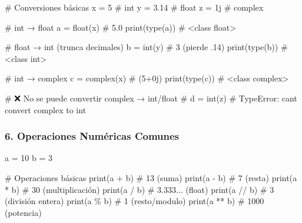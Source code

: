 \documentclass[
  doc,
  floatsintext,
  longtable,
  a4paper,
  nolmodern,
  notxfonts,
  notimes,
  12pt,
  colorlinks=true,linkcolor=blue,citecolor=blue,urlcolor=blue]{apa7}
\newenvironment{Shaded}{\begin{snugshade}}{\end{snugshade}}
\newcommand{\BuiltInTok}[1]{\textcolor[rgb]{0.00,0.23,0.31}{#1}}
\newcommand{\CommentTok}[1]{\textcolor[rgb]{0.37,0.37,0.37}{#1}}
\newcommand{\DecValTok}[1]{\textcolor[rgb]{0.68,0.00,0.00}{#1}}
\newcommand{\FloatTok}[1]{\textcolor[rgb]{0.68,0.00,0.00}{#1}}
\newcommand{\NormalTok}[1]{\textcolor[rgb]{0.00,0.23,0.31}{#1}}
\newcommand{\OperatorTok}[1]{\textcolor[rgb]{0.37,0.37,0.37}{#1}}
\newcommand{\OtherTok}[1]{\textcolor[rgb]{0.00,0.23,0.31}{#1}}
\begin{document}
\begin{Shaded}
\begin{Highlighting}[]
\CommentTok{\# Conversiones básicas}
\NormalTok{x }\OperatorTok{=} \DecValTok{5}        \CommentTok{\# int}
\NormalTok{y }\OperatorTok{=} \FloatTok{3.14}     \CommentTok{\# float}
\NormalTok{z }\OperatorTok{=} \OtherTok{1j}       \CommentTok{\# complex}

\CommentTok{\# int → float}
\NormalTok{a }\OperatorTok{=} \BuiltInTok{float}\NormalTok{(x)      }\CommentTok{\# 5.0}
\BuiltInTok{print}\NormalTok{(}\BuiltInTok{type}\NormalTok{(a))    }\CommentTok{\# \textless{}class \textquotesingle{}float\textquotesingle{}\textgreater{}}

\CommentTok{\# float → int (trunca decimales)}
\NormalTok{b }\OperatorTok{=} \BuiltInTok{int}\NormalTok{(y)        }\CommentTok{\# 3 (pierde .14)}
\BuiltInTok{print}\NormalTok{(}\BuiltInTok{type}\NormalTok{(b))    }\CommentTok{\# \textless{}class \textquotesingle{}int\textquotesingle{}\textgreater{}}

\CommentTok{\# int → complex}
\NormalTok{c }\OperatorTok{=} \BuiltInTok{complex}\NormalTok{(x)    }\CommentTok{\# (5+0j)}
\BuiltInTok{print}\NormalTok{(}\BuiltInTok{type}\NormalTok{(c))    }\CommentTok{\# \textless{}class \textquotesingle{}complex\textquotesingle{}\textgreater{}}

\CommentTok{\# ❌ No se puede convertir complex → int/float}
\CommentTok{\# d = int(z)      \# TypeError: can\textquotesingle{}t convert complex to int}
\end{Highlighting}
\end{Shaded}

\subsubsection{6. Operaciones Numéricas
Comunes}\label{operaciones-numuxe9ricas-comunes}

\begin{Shaded}
\begin{Highlighting}[]
\NormalTok{a }\OperatorTok{=} \DecValTok{10}
\NormalTok{b }\OperatorTok{=} \DecValTok{3}

\CommentTok{\# Operaciones básicas}
\BuiltInTok{print}\NormalTok{(a }\OperatorTok{+}\NormalTok{ b)   }\CommentTok{\# 13 (suma)}
\BuiltInTok{print}\NormalTok{(a }\OperatorTok{{-}}\NormalTok{ b)   }\CommentTok{\# 7  (resta)}
\BuiltInTok{print}\NormalTok{(a }\OperatorTok{*}\NormalTok{ b)   }\CommentTok{\# 30 (multiplicación)}
\BuiltInTok{print}\NormalTok{(a }\OperatorTok{/}\NormalTok{ b)   }\CommentTok{\# 3.333... (float)}
\BuiltInTok{print}\NormalTok{(a }\OperatorTok{//}\NormalTok{ b)  }\CommentTok{\# 3  (división entera)}
\BuiltInTok{print}\NormalTok{(a }\OperatorTok{\%}\NormalTok{ b)   }\CommentTok{\# 1  (resto/modulo)}
\BuiltInTok{print}\NormalTok{(a }\OperatorTok{**}\NormalTok{ b)  }\CommentTok{\# 1000 (potencia)}
\end{Highlighting}
\end{Shaded}
\end{document}
